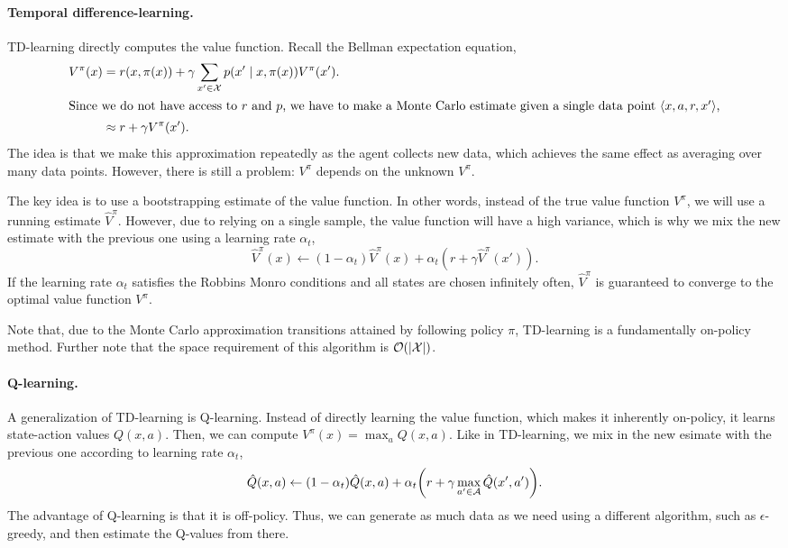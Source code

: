 \paragraph{Temporal difference-learning.}

TD-learning directly computes the value function. Recall the Bellman
expectation equation, 
\begin{align*}
  V^\pi(x) &= r(x,\pi(x)) + \gamma \sum_{x'\in\mathcal{X}} p(x'\mid x,\pi(x)) V^\pi(x'). \\
  \intertext{Since we do not have access to $r$ and $p$, we have to make a
  Monte Carlo estimate given a single data point $\langle x,a,r,x' \rangle$,}
  &\approx r + \gamma V^\pi(x')
.\end{align*}
The idea is that we make this approximation repeatedly as the agent collects
new data, which achieves the same effect as averaging over many data points.
However, there is still a problem: $V^\pi$ depends on the unknown $V^\pi$.

The key idea is to use a bootstrapping estimate of the value function. In other
words, instead of the true value function $V^\pi$, we will use a running
estimate $\hat{V}^\pi$. However, due to relying on a single sample, the value
function will have a high variance, which is why we mix the new estimate with
the previous one using a learning rate $\alpha_t$, \[
  \hat{V}^\pi(x) \gets (1-\alpha_t) \hat{V}^\pi(x) + \alpha_t(r + \gamma \hat{V}^\pi(x'))
.\]
If the learning rate $\alpha_t$ satisfies the Robbins Monro conditions and all
states are chosen infinitely often, $\hat{V}^\pi$ is guaranteed to converge to
the optimal value function $V^\pi$.

Note that, due to the Monte Carlo approximation \wrt transitions attained by
following policy $\pi$, TD-learning is a fundamentally on-policy method.
Further note that the space requirement of this algorithm is $\bigo{|\X|}$.

\paragraph{Q-learning.}

A generalization of TD-learning is Q-learning. Instead of directly learning the
value function, which makes it inherently on-policy, it learns state-action
values $Q(x,a)$. Then, we can compute $V^\pi(x) = \max_{a} Q(x,a)$. Like in
TD-learning, we mix in the new esimate with the previous one according to
learning rate $\alpha_t$, \[
  \hat{Q}(x,a) \gets (1-\alpha_t) \hat{Q}(x,a) + \alpha_t \lft( r + \gamma \max_{a'\in\mathcal{A}} \hat{Q}(x',a') \rgt)
.\]
The advantage of Q-learning is that it is off-policy. Thus, we can generate as
much data as we need using a different algorithm, such as $\epsilon$-greedy,
and then estimate the Q-values from there.

